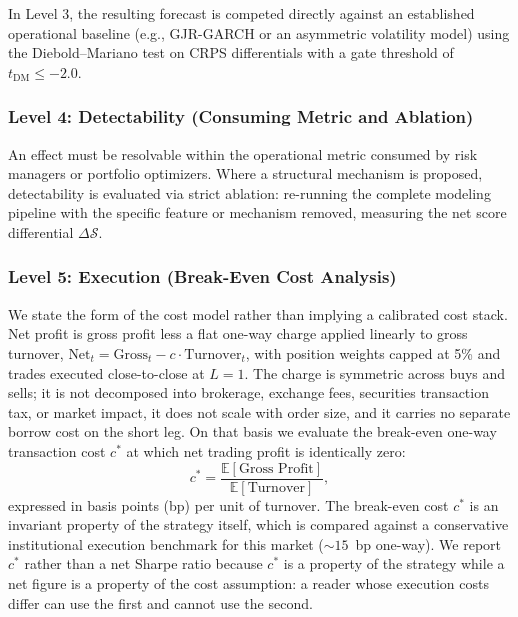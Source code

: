 \documentclass{ieeeaccess}
\begin{document}
In Level 3, the resulting forecast is competed directly against an established operational baseline (e.g., GJR-GARCH or an asymmetric volatility model) using the Diebold--Mariano test on CRPS differentials with a gate threshold of $t_{\text{DM}} \le -2.0$.

\subsubsection{Level 4: Detectability (Consuming Metric and Ablation)}
An effect must be resolvable within the operational metric consumed by risk managers or portfolio optimizers. Where a structural mechanism is proposed, detectability is evaluated via strict ablation: re-running the complete modeling pipeline with the specific feature or mechanism removed, measuring the net score differential $\Delta \mathcal{S}$.

\subsubsection{Level 5: Execution (Break-Even Cost Analysis)}
We state the form of the cost model rather than implying a calibrated cost stack. Net profit is gross profit less a flat one-way charge applied linearly to gross turnover, $\text{Net}_t = \text{Gross}_t - c \cdot \text{Turnover}_t$, with position weights capped at 5\% and trades executed close-to-close at $L=1$. The charge is symmetric across buys and sells; it is not decomposed into brokerage, exchange fees, securities transaction tax, or market impact, it does not scale with order size, and it carries no separate borrow cost on the short leg. On that basis we evaluate the break-even one-way transaction cost $c^*$ at which net trading profit is identically zero:
\begin{equation}
c^* = \frac{\mathbb{E}[\text{Gross Profit}]}{\mathbb{E}[\text{Turnover}]},
\label{eq:breakeven}
\end{equation}
expressed in basis points (bp) per unit of turnover. The break-even cost $c^*$ is an invariant property of the strategy itself, which is compared against a conservative institutional execution benchmark for this market ($\sim 15$~bp one-way). We report $c^*$ rather than a net Sharpe ratio because $c^*$ is a property of the strategy while a net figure is a property of the cost assumption: a reader whose execution costs differ can use the first and cannot use the second.
\end{document}
